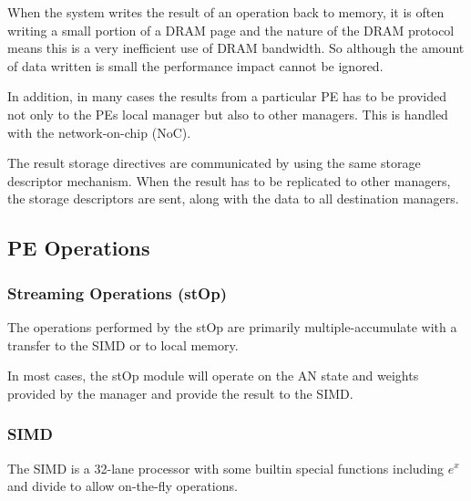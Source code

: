 \documentclass[journal]{IEEEtran}
\begin{document}
When the system writes the result of an operation back to memory, it is often writing a small portion of a DRAM page and the nature of the DRAM protocol means this is a very inefficient use of DRAM bandwidth. So although the amount of data written is small the performance impact cannot be ignored.

In addition, in many cases the results from a particular PE has to be provided not only to the PEs local manager but also to other managers. This is handled with the network-on-chip (NoC).

The result storage directives are communicated by using the same storage descriptor mechanism. When the result has to be replicated to other managers, the storage descriptors are sent, along with the data to all destination managers.


\subsection{PE Operations}
\label{sec:PE Operations}

\subsubsection{Streaming Operations (stOp)}
\label{ssec:streamingOps}
The operations performed by the stOp are primarily multiple-accumulate with a transfer to the SIMD or to local memory.

In most cases, the stOp module will operate on the AN state and weights provided by the manager and provide the result to the SIMD.
\subsubsection{SIMD}
\label{ssec:SIMD}

The SIMD is a 32-lane processor with some builtin special functions including $e^x$ and divide to allow on-the-fly operations. 
\end{document}

